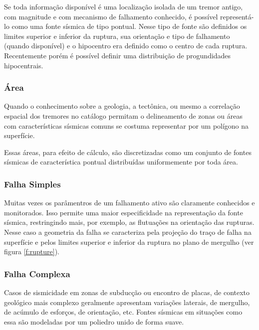 Se toda informação disponível é uma localização isolada de um tremor antigo, com magnitude e com mecanismo de
falhamento conhecido, é possível representá-lo como uma fonte sísmica de tipo pontual. 
Nesse tipo de fonte são definidos os limites superior e inferior da ruptura, 
sua orientação e tipo de falhamento (quando disponível) 
e o hipocentro era definido como o centro de cada ruptura. Recentemente porém é possível definir uma distribuição de
progundidades hipocentrais.

\subsubsection{Área}
\label{sec:area_source}

Quando o conhecimento sobre a geologia, a tectônica, ou mesmo a correlação espacial dos tremores no catálogo permitam
o delineamento de zonas ou áreas com características sísmicas comuns se costuma representar por um polígono na
superfície.

Essas áreas, para efeito de cálculo, são discretizadas como um conjunto de fontes sísmicas de
característica pontual distribuídas uniformemente por toda área.

\subsubsection{Falha Simples}
\label{sec:simple_fault_source}

Muitas vezes os parâmentros de um falhamento ativo são claramente conhecidos e monitorados. Isso permite uma maior
especificidade na representação da fonte sísmica, restringindo mais, por exemplo, as flutuações na orientação das
rupturas.
Nesse caso a geometria da falha se caracteriza pela projeção do traço de falha na superfície e pelos limites superior e
inferior da ruptura no plano de mergulho (ver figura \ref{f:rupture}).


\subsubsection{Falha Complexa}
\label{sec:complex_fault_source}

Casos de sismicidade em zonas de subducção ou encontro de placas, de contexto geológico mais complexo 
geralmente apresentam variações laterais, de mergulho, de acúmulo de esforços, de orientação, etc. Fontes sísmicas em
situações como essa são modeladas por um poliedro unido de forma suave.


